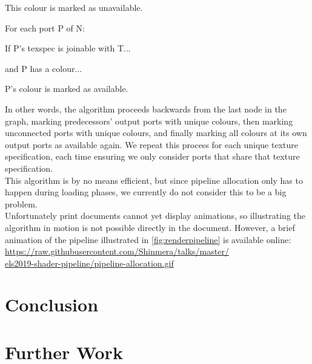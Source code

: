 \documentclass[format=sigconf]{acmart}
\begin{document}
\begin{step}
\begin{step}
\begin{step}
\begin{step}
      \item This colour is marked as unavailable.
      \end{step}
    \item For each port P of N:
      \begin{step}
      \item If P's texspec is joinable with T...
      \item and P has a colour...
      \item P's colour is marked as available.
      \end{step}
    \end{step}
  \end{step}
\end{step}

In other words, the algorithm proceeds backwards from the last node in the graph, marking predecessors' output ports with unique colours, then marking unconnected ports with unique colours, and finally marking all colours at its own output ports as available again. We repeat this process for each unique texture specification, each time ensuring we only consider ports that share that texture specification. \\

This algorithm is by no means efficient, but since pipeline allocation only has to happen during loading phases, we currently do not consider this to be a big problem. \\

Unfortunately print documents cannot yet display animations, so illustrating the algorithm in motion is not possible directly in the document. However, a brief animation of the pipeline illustrated in \autoref{fig:renderpipeline} is available online: \\

\href{https://raw.githubusercontent.com/Shinmera/talks/master/els2019-shader-pipeline/pipeline-allocation.gif}{https://raw.githubusercontent.com/Shinmera/talks/master/\\els2019-shader-pipeline/pipeline-allocation.gif}

\section{Conclusion}\label{conclusion}

\section{Further Work}\label{further-work}
\end{document}
